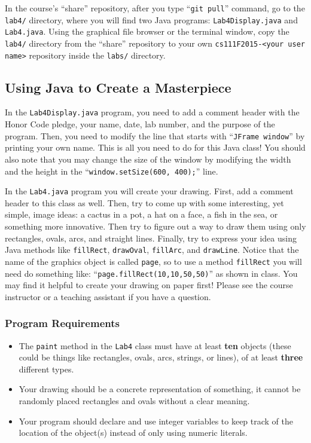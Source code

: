 In the course's ``share'' repository, after you type ``{\tt git pull}'' command, go to the {\tt lab4/} directory, where you
will find two Java programs: {\tt Lab4Display.java} and {\tt Lab4.java}. Using the graphical file browser or the
terminal window, copy the {\tt lab4/} directory from the ``share'' repository to your own {\tt cs111F2015-<your user
name>} repository inside the {\tt labs/} directory.

\subsection*{Using Java to Create a Masterpiece}

In the {\tt Lab4Display.java} program, you need to add a comment header with the Honor Code pledge, your name, date, lab
number, and the purpose of the program. Then, you need to modify the line that starts with ``{\tt JFrame window}'' by
printing your own name. This is all you need to do for this Java class! You should also note that you may change the size of
the window by modifying the width and the height in the ``{\tt window.setSize(600, 400);}'' line.

In the {\tt Lab4.java} program you will create your drawing. First, add a comment header to this class as well.  Then,
try to come up with some interesting, yet simple, image ideas: a cactus in a pot, a hat on a face, a fish in the sea, or
something more innovative.  Then try to figure out a way to draw them using only rectangles, ovals, arcs, and straight
lines.  Finally, try to express your idea using Java methods like {\tt fillRect}, {\tt drawOval}, {\tt fillArc}, and
{\tt drawLine}. Notice that the name of the graphics object is called {\tt page}, so to use a method {\tt fillRect} you
will need do something like: ``{\tt page.fillRect(10,10,50,50)}'' as shown in class.  You may find it helpful to create
your drawing on paper first! Please see the course instructor or a teaching assistant if you have a question.

\vspace*{-.1in}
\subsubsection*{Program Requirements}

\begin{itemize}
\item The {\tt paint} method in the {\tt Lab4} class must have at least \textbf{ten} objects (these could be things like rectangles, ovals, arcs, strings, or lines), of at least \textbf{three} different types.
\item Your drawing should be a concrete representation of something, it cannot be randomly placed rectangles and
  ovals without a clear meaning.
\item Your program should declare and use integer variables to keep track of
the location of the object(s) instead of only using numeric literals.
\end{itemize}

